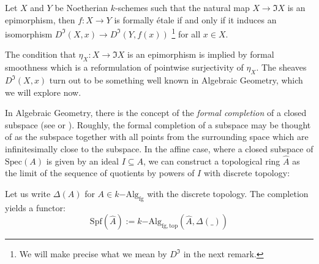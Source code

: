 \documentclass[9pt,twosided]{amsart}
\newcommand{\Spec}{\ensuremath{\mathrm{Spec}}}
\newcommand{\Spf}{\ensuremath{\mathrm{Spf}}}
\newcommand{\fgkAlg}{\ensuremath{k\mathrm{-Alg}_{\mathrm{fg}}}}
\newcommand{\fgkAlgTop}{\ensuremath{k\mathrm{-Alg}_{\mathrm{fg,top}}}}
\begin{document}
Let $X$ and $Y$ be Noetherian $k$-schemes such that the natural map $X\to \Im X$ is an epimorphism,
then $f:X\to Y$ is formally étale if and only if it induces an isomorphism $D^\Im(X,x)\to D^\Im(Y,f(x))$
\footnote{We will make precise what we mean by $D^\Im$ in the next remark. } for all $x\in X$.

The condition that $\eta_X:X\to \Im X$ is an epimorphism is implied by formal smoothness which is a reformulation of pointwise surjectivity of $\eta_X$.
The sheaves $D^\Im(X,x)$ turn out to be something well known in Algebraic Geometry, which we will explore now.

In Algebraic Geometry, there is the concept of the \emph{formal completion} of a closed subspace (see \cite[p.194]{hartshorne} or \cite[10.8]{ega}).
Roughly, the formal completion of a subspace may be thought of as the subspace together with
all points from the surrounding space which are infinitesimally close to the subspace.
In the affine case, where a closed subspace of $\Spec(A)$ is given by an ideal $I\subseteq A$, we can construct a topological ring $\hat{A}$
as the limit of the sequence of quotients by powers of $I$ with discrete topology:
\begin{center}
\end{center}
Let us write $\Delta(A)$ for $A\in\fgkAlg$ with the discrete topology.
The completion yields a functor:
\[ \Spf(\hat{A}) := \fgkAlgTop(\hat{A},\Delta(\_))\]
\end{document}

